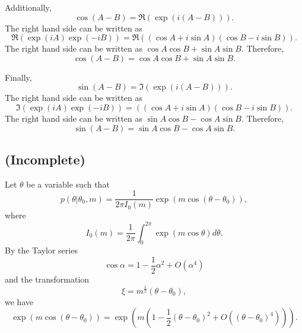 Additionally,
%
\begin{equation}
\cos (A - B)
=
\Re
\left(
	\exp 
	\left(
		i (A - B) 
	\right)
\right).
\end{equation}
%
The right hand side can be written as
%
\begin{equation}
\Re
\left(
	\exp(i A)
	\exp(- i B)
\right)
=
\Re
\left(
	(\cos A + i \sin A)
	(\cos B - i \sin B)
\right).
\end{equation}
%
The right hand side can be written as $\cos A \cos B + \sin A \sin B$.
Therefore,
%
\begin{equation}
\cos (A - B)
=
\cos A 
\cos B 
+ 
\sin A 
\sin B.
\end{equation}
%

Finally,
%
\begin{equation}
\sin (A - B)
=
\Im
\left(
	\exp 
	\left(
		i (A - B) 
	\right)
\right).
\end{equation}
%
The right hand side can be written as
%
\begin{equation}
\Im
\left(
	\exp(i A)
	\exp(- i B)
\right)
=
\left(
	(\cos A + i \sin A)
	(\cos B - i \sin B)
\right).
\end{equation}
%
The right hand side can be written as $\sin A \cos B - \cos A \sin B$.
Therefore,
%
\begin{equation}
\sin (A - B)
=
\sin A 
\cos B 
- 
\cos A 
\sin B.
\end{equation}
%


\subsection{(Incomplete)}
\label{2.52}
Let $\theta$ be a variable such that 
%
\begin{equation}
p(\theta | \theta_0, m)
=
\frac{1}{2 \pi I_0 (m)}
\exp
\left(
	m 
	\cos (\theta - \theta_0)
\right),
\end{equation}
%
where
%
\begin{equation}
I_0(m)
=
\frac{1}{2 \pi}
\int_{0}^{2 \pi}
\exp(m \cos \theta) 
d\theta.
\end{equation}
%
By the Taylor series
%
\begin{equation}
\cos \alpha
=
1 
- 
\frac{1}{2} 
\alpha ^ 2 
+ 
O 
\left( 
	\alpha ^ 4 
\right)
\end{equation}
%
and the transformation
%
\begin{equation}
\xi
=
m ^ \frac{1}{2}
(\theta - \theta_0),
\end{equation}
%
we have
%
\begin{equation}
\exp
\left(
	m 
	\cos (\theta - \theta_0)
\right)
=
\exp
\left(
	m
	\left(
		1
		-
		\frac{1}{2}
		(\theta - \theta_0) ^ 2
		+
		O 
		\left(
			(\theta - \theta_0) ^ 4
		\right)
	\right)
\right).
\end{equation}
%


